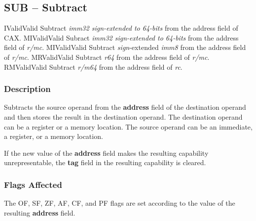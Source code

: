 \clearpage
{}
{}
\subsection*{SUB -- Subtract}

\begin{x86opcodetable}
  {I}{Valid}{Valid}
  {Subtract \emph{imm32 sign-extended to 64-bits} from the address field of
    CAX.}
  {MI}{Valid}{Valid}
  {Subract \emph{imm32 sign-extended to 64-bits} from the address field of
    \emph{r/mc}.}
  {MI}{Valid}{Valid}
  {Subtract \emph{sign}-extended \emph{imm8} from the address field of
    \emph{r/mc}.}
  {MR}{Valid}{Valid}
  {Subtract \emph{r64} from the address field of \emph{r/mc}.}
  {RM}{Valid}{Valid}
  {Subtract \emph{r/m64} from the address field of \emph{rc}.}
\end{x86opcodetable}

\begin{x86opentable}
\end{x86opentable}

\subsubsection*{Description}

Subtracts the source operand from the \textbf{address} field of the
destination operand and then stores the result in the destination
operand. The destination operand can be a register or a memory
location. The source operand can be an immediate, a register, or a
memory location.

If the new value of the \textbf{address} field makes the resulting
capability unrepresentable, the \textbf{tag} field in the resulting
capability is cleared.

\subsubsection*{Flags Affected}

The OF, SF, ZF, AF, CF, and PF flags are set according to the value of
the resulting \textbf{address} field.
